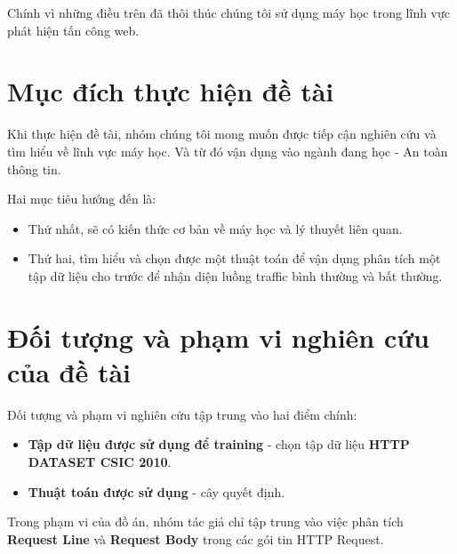 \documentclass[../main-report.tex]{subfiles}
\begin{document}
Chính vì những điều trên đã thôi thúc chúng tôi sử dụng máy học trong lĩnh vực phát hiện tấn công web.

\section*{Mục đích thực hiện đề tài}
Khi thực hiện đề tài, nhóm chúng tôi mong muốn được tiếp cận nghiên cứu và tìm hiểu về lĩnh vực máy học. Và từ đó vận dụng vào ngành đang học - An toàn thông tin.

Hai mục tiêu hướng đến là:

\begin{itemize}
\item Thứ nhất, sẽ có kiến thức cơ bản về máy học và lý thuyết liên quan.
\item Thứ hai, tìm hiểu và chọn được một thuật toán để vận dụng phân tích một tập dữ liệu cho trước để nhận diện luồng traffic bình thường và bất thường.
\end{itemize}

\section*{Đối tượng và phạm vi nghiên cứu của đề tài}
Đối tượng và phạm vi nghiên cứu tập trung vào hai điểm chính:

\begin{itemize}
\item \textbf{Tập dữ liệu được sử dụng để training} - chọn tập dữ liệu \textbf{HTTP DATASET CSIC 2010}.
\item \textbf{Thuật toán được sử dụng} - cây quyết định.
\end{itemize}

Trong phạm vi của đồ án, nhóm tác giả chỉ tập trung vào việc phân tích \textbf{Request Line} và \textbf{Request Body} trong các gói tin HTTP Request.
\end{document}
